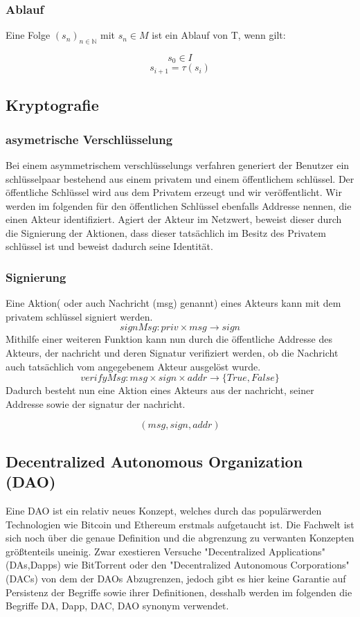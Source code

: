 \documentclass[a4paper,12pt]{article}
\begin{document}
\subsubsection*{Ablauf}
Eine Folge $(s_n)_{n\in\mathbb{N}}$ mit $s_n\in M$ ist ein Ablauf von T, wenn gilt:

\[ s_0 \in I \] 
\[ s_{i+1} = \tau(s_i) \] 


\subsection{Kryptografie}


\subsubsection*{asymetrische Verschlüsselung}
Bei einem asymmetrischem verschlüsselungs verfahren generiert der Benutzer ein schlüsselpaar bestehend aus einem privatem und einem öffentlichem schlüssel. Der öffentliche Schlüssel wird aus dem Privatem erzeugt und wir veröffentlicht. Wir werden im folgenden für den öffentlichen Schlüssel ebenfalls Addresse nennen, die einen Akteur identifiziert. Agiert der Akteur im Netzwert, beweist dieser durch die Signierung der Aktionen, dass dieser tatsächlich im Besitz des Privatem schlüssel ist und beweist dadurch seine Identität.

\subsubsection*{Signierung}

Eine Aktion( oder auch Nachricht (msg) genannt) eines Akteurs kann mit dem privatem schlüssel signiert werden.
\[ signMsg: priv \times msg \rightarrow sign \] 
Mithilfe einer weiteren Funktion kann nun durch die öffentliche Addresse des Akteurs, der nachricht und deren Signatur verifiziert werden, ob die Nachricht auch tatsächlich vom angegebenem Akteur ausgelöst wurde.
\[ verifyMsg: msg \times sign \times addr \rightarrow \{ True, False \} \] 
Dadurch besteht nun eine Aktion eines Akteurs aus der nachricht, seiner Addresse sowie der signatur der nachricht.

\[ (msg, sign, addr) \]

\subsection{Decentralized Autonomous Organization (DAO)}
Eine DAO ist ein relativ neues Konzept, welches durch das populärwerden Technologien wie Bitcoin und Ethereum erstmals aufgetaucht ist. Die Fachwelt ist sich noch über die genaue Definition und die abgrenzung zu verwanten Konzepten größtenteils uneinig. Zwar exestieren Versuche "Decentralized Applications" (DAs,Dapps) wie BitTorrent oder den "Decentralized Autonomous Corporations" (DACs) von dem der DAOs Abzugrenzen, jedoch gibt es hier keine Garantie auf Persistenz der Begriffe sowie ihrer Definitionen, desshalb werden im folgenden die Begriffe DA, Dapp, DAC, DAO synonym verwendet.
\end{document}
